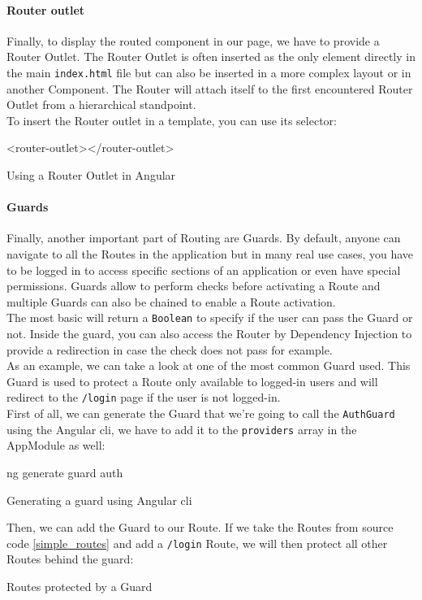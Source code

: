 \documentclass[twoside, openright,11pt,a4paper]{book}
\newenvironment{code}{\captionsetup{type=listing}}{}
\begin{document}
\paragraph{Router outlet}
Finally, to display the routed component in our page, we have to provide a Router Outlet. The Router Outlet is often inserted as the only element directly in the main \verb+index.html+ file but can also be inserted in a more complex layout or in another Component. The Router will attach itself to the first encountered Router Outlet from a hierarchical standpoint.\\

To insert the Router outlet in a template, you can use its selector:
\begin{code}
\begin{inlinehtml}
<router-outlet></router-outlet>
\end{inlinehtml}
	\caption{Using a Router Outlet in Angular}
\end{code}
\paragraph{Guards}
\label{guards}
Finally, another important part of Routing are Guards. By default, anyone can navigate to all the Routes in the application but in many real use cases, you have to be logged in to access specific sections of an application or even have special permissions. Guards allow to perform checks before activating a Route and multiple Guards can also be chained to enable a Route activation. \\

The most basic will return a \verb+Boolean+ to specify if the user can pass the Guard or not. Inside the guard, you can also access the Router by Dependency Injection to provide a redirection in case the check does not pass for example. \\

As an example, we can take a look at one of the most common Guard used. This Guard is used to protect a Route only available to logged-in users and will redirect to the \verb+/login+ page if the user is not logged-in.\\

First of all, we can generate the Guard that we're going to call the \verb+AuthGuard+ using the Angular \gls{cli}, we have to add it to the \verb+providers+ array in the AppModule as well:
\begin{code}
	\begin{shell}
ng generate guard auth
	\end{shell}
	\caption{Generating a guard using Angular \gls{cli}}
\end{code}
Then, we can add the Guard to our Route. If we take the Routes from source code \ref{simple_routes} and add a \verb+/login+ Route, we will then protect all other Routes behind the guard:
\begin{code}
	\caption{Routes protected by a Guard}
\end{code}
\end{document}
